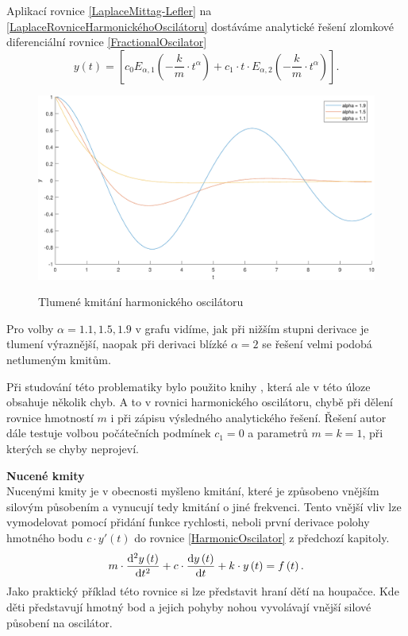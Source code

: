 \documentclass[a4paper,12pt,twoside]{article}
\theoremstyle{definition}
\theoremstyle{remark}
\numberwithin{equation}{section}
\numberwithin{table}{section}
\numberwithin{figure}{section}
\newcommand{\dx}[1]{\mathrm{d} #1}
\begin{document}
Aplikací  rovnice \eqref{LaplaceMittag-Lefler} na \eqref{LaplaceRovniceHarmonickéhoOscilátoru} dostáváme analytické řešení zlomkové diferenciální rovnice \eqref{FractionalOscilator}
\begin{equation}\label{LaplaceMittagLefler}
	y\left(t\right) = \left[ c_{0} E_{\alpha, 1}\left(-\frac{k}{m}\cdot t^{\alpha}\right) + c_{1}\cdot t \cdot E_{\alpha, 2} \left(-\frac{k}{m}\cdot t ^{\alpha}\right)\right] .
\end{equation}
\begin{figure} [h!]
	\caption{Tlumené kmitání harmonického oscilátoru}
	\includegraphics[width=1\textwidth]{FractionalOscillator_AnalyticalSolution.pdf}
	\label{fig:HarmonicOscilatorAnalytical}
\end{figure}

Pro volby $\alpha = 1.1, 1.5, 1.9$ v grafu vidíme, jak při nižším stupni derivace je tlumení výraznější, naopak při derivaci blízké $\alpha = 2$ se řešení velmi podobá netlumeným kmitům.

Při studování této problematiky bylo použito knihy \cite{ChenInMechanics}, která ale v této úloze obsahuje několik chyb. A to v rovnici harmonického oscilátoru, chybě při dělení rovnice hmotností $m$ i při zápisu výsledného analytického řešení. Řešení autor dále testuje volbou počátečních podmínek $c_{1} = 0$ a parametrů $m = k = 1$, při kterých se chyby neprojeví. %




\textbf{Nucené kmity}\\
Nucenými kmity je v obecnosti myšleno kmitání, které je způsobeno vnějším silovým působením a vynucují tedy kmitání o jiné frekvenci.
Tento vnější vliv lze vymodelovat pomocí přidání funkce rychlosti, neboli první derivace polohy hmotného bodu $c\cdot y'\left(t\right)$ do rovnice \ref{HarmonicOscilator} z předchozí kapitoly.
\begin{equation}
	m\cdot \frac{\dx ^{2} y\left(t\right)}{\dx t^{2}} + c\cdot \frac{\dx  y\left(t\right)}{\dx t} +k \cdot y\left(t\right) = f\left(t\right).
\end{equation}
Jako praktický příklad této rovnice si lze představit hraní dětí na houpačce. Kde děti představují hmotný bod a jejich pohyby nohou vyvolávají vnější silové působení na oscilátor.
\end{document}
